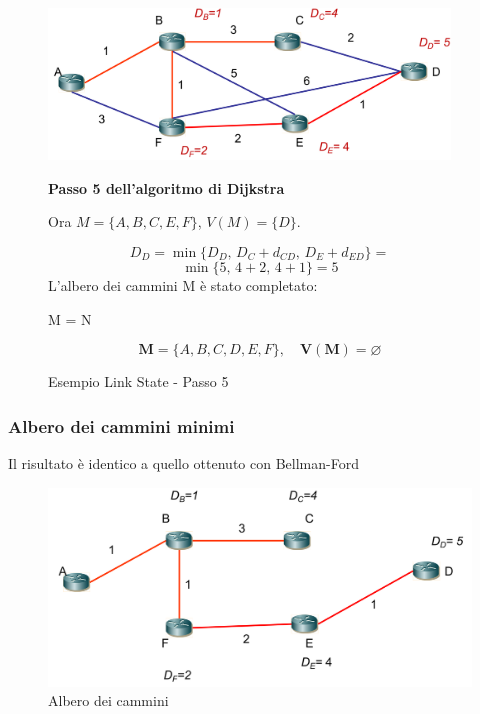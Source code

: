 \begin{figure}[h!]
    \begin{minipage}{0.5\textwidth}
        \centering
        \includegraphics[width=0.95\textwidth]{images/linkstate12.png}
        \caption{Esempio Link State - Passo 5}
        \label{fig:linkstate11}
    \end{minipage}\hfill
    \begin{minipage}{0.49\textwidth}
        \textbf{Passo 5 dell'algoritmo di Dijkstra}

        Ora $M = \{A, B, C, E, F\}$, $V(M) = \{D\}$.

        \[
        D_D = \min\{ D_D,\, D_C + d_{CD},\, D_E + d_{ED} \} = 
        \]
        \[
        \min\{5,\, 4 + 2,\, 4 + 1\} = 5
        \]
        L'albero dei cammini M è stato completato: 
        \begin{center}
            M = N
        \end{center}    
        \[
        \mathbf{M} = \{A, B, C, D, E, F\}, \quad \mathbf{V(M)} = \varnothing
        \]\end{minipage}
\end{figure}

\subsubsection{Albero dei cammini minimi}
Il risultato è identico a quello ottenuto con Bellman-Ford

\begin{figure}[h!]
    \centering
    \includegraphics[width=1\textwidth]{images/linkstate134.png}
    \caption{Albero dei cammini}
    \label{fig:alberocammini}
\end{figure}


